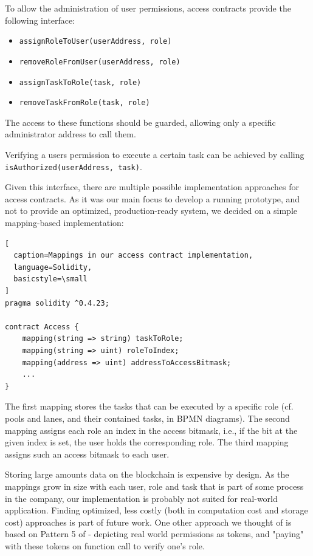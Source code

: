 \documentclass[runningheads]{llncs}
\begin{document}
To allow the administration of user permissions, access contracts provide the following interface:
\begin{itemize}
  \item 
    \texttt{assignRoleToUser(userAddress, role)}
  \item
    \texttt{removeRoleFromUser(userAddress, role)}
  \item
    \texttt{assignTaskToRole(task, role)}
  \item
    \texttt{removeTaskFromRole(task, role)}
\end{itemize}
The access to these functions should be guarded, allowing only a specific administrator address to call them.

Verifying a users permission to execute a certain task can be achieved by calling \texttt{isAuthorized(userAddress, task)}.
\newline

Given this interface, there are multiple possible implementation approaches for access contracts.
As it was our main focus to develop a running prototype, and not to provide an optimized, production-ready system, we decided on a simple mapping-based implementation:
\begin{lstlisting}[
  caption=Mappings in our access contract implementation,
  language=Solidity,
  basicstyle=\small
]
pragma solidity ^0.4.23;

contract Access {
    mapping(string => string) taskToRole;
    mapping(string => uint) roleToIndex;
    mapping(address => uint) addressToAccessBitmask;
    ...
}
\end{lstlisting}
The first mapping stores the tasks that can be executed by a specific role (cf. pools and lanes, and their contained tasks, in BPMN diagrams).
The second mapping assigns each role an index in the access bitmask, i.e., if the bit at the given index is set, the user holds the corresponding role.
The third mapping assigns such an access bitmask to each user.

Storing large amounts data on the blockchain is expensive by design.
As the mappings grow in size with each user, role and task that is part of some process in the company, our implementation is probably not suited for real-world application.
Finding optimized, less costly (both in computation cost and storage cost) approaches is part of future work.
One other approach we thought of is based on Pattern 5 of \cite{xu2018pattern} - depicting real world permissions as tokens, and "paying" with these tokens on function call to verify one's role.
\end{document}
